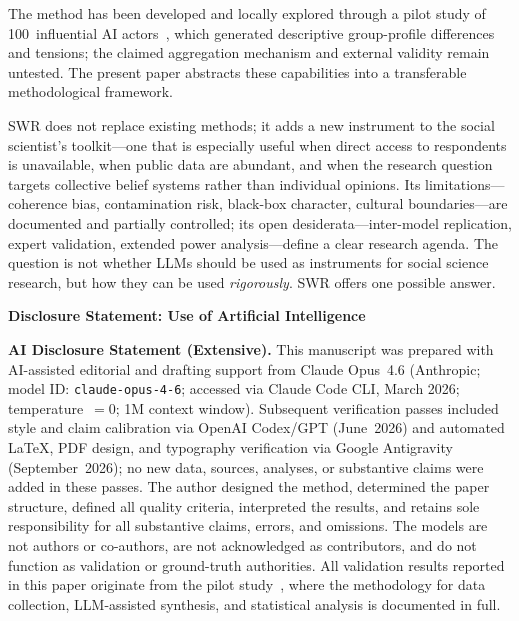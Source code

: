 \documentclass[11pt,a4paper]{article}
\newcommand{\backmatterlabel}[1]{%
  \par\smallskip
  \noindent\textbf{#1}\enspace
}
\begin{document}
The method has been developed and locally explored through a pilot study of 100~influential AI actors~\citep{Geiger2026PaperA}, which generated descriptive group-profile differences and tensions; the claimed aggregation mechanism and external validity remain untested. The present paper abstracts these capabilities into a transferable methodological framework.

SWR does not replace existing methods; it adds a new instrument to the social scientist's toolkit---one that is especially useful when direct access to respondents is unavailable, when public data are abundant, and when the research question targets collective belief systems rather than individual opinions. Its limitations---coherence bias, contamination risk, black-box character, cultural boundaries---are documented and partially controlled; its open desiderata---inter-model replication, expert validation, extended power analysis---define a clear research agenda. The question is not whether LLMs should be used as instruments for social science research, but how they can be used \emph{rigorously}. SWR offers one possible answer.


\begingroup
\footnotesize
{}
\setlength{\parskip}{0pt}
\backmatterlabel{Disclosure Statement: Use of Artificial Intelligence}

\noindent\textbf{AI Disclosure Statement (Extensive).}
This manuscript was prepared with AI-assisted editorial and drafting support from Claude Opus~4.6 (Anthropic; model ID: \texttt{claude-opus-4-6}; accessed via Claude Code CLI, March 2026; temperature~$= 0$; 1M context window). Subsequent verification passes included style and claim calibration via OpenAI Codex/GPT (June~2026) and automated LaTeX, PDF design, and typography verification via Google Antigravity (September~2026); no new data, sources, analyses, or substantive claims were added in these passes. The author designed the method, determined the paper structure, defined all quality criteria, interpreted the results, and retains sole responsibility for all substantive claims, errors, and omissions. The models are not authors or co-authors, are not acknowledged as contributors, and do not function as validation or ground-truth authorities. All validation results reported in this paper originate from the pilot study~\citep{Geiger2026PaperA}, where the methodology for data collection, LLM-assisted synthesis, and statistical analysis is documented in full.
\end{document}
